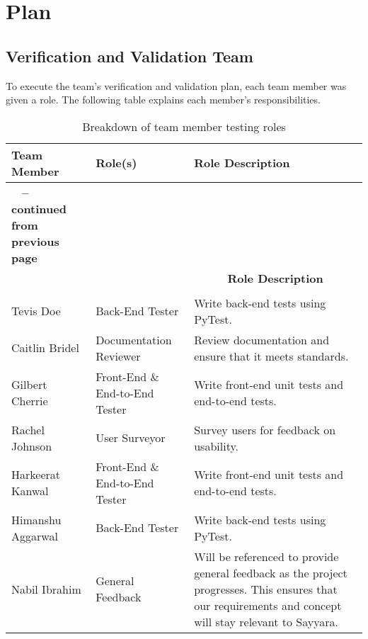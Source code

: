 \documentclass[12pt, titlepage]{article}
\begin{document}
\citet{SRS}

\section{Plan}


\subsection{Verification and Validation Team}

To execute the team's verification and validation plan, each team member was given a role. The following table explains each member's responsibilities.

\renewcommand{\arraystretch}{1.8}%
\begin{longtable}{|>{\centering\arraybackslash}m{.22\linewidth}|>{\centering\arraybackslash}m{.19\linewidth}|m{.59\linewidth}| }
\caption{Breakdown of team member testing roles}
\label{tab:teamRoles}
\\ \hline
\textbf{Team Member} & \textbf{Role(s)} & \textbf{Role Description} \\
\hline
\endfirsthead

\multicolumn{3}{c}
{{\bfseries \tablename\ \thetable{} -- continued from previous page}} \\
\hline \multicolumn{1}{|c|}{\textbf{Team Member}} & \multicolumn{1}{c|}{\textbf{Role(s)}} & \multicolumn{1}{c|}{\textbf{Role Description}} \\ \hline 
\endhead

\hline \multicolumn{3}{|r|}{{Continued on next page}} \\ \hline
\endfoot

\endlastfoot

Tevis Doe & Back-End Tester  &  Write back-end tests using PyTest. \\
\hline
Caitlin Bridel & Documentation Reviewer & Review documentation and ensure that it meets standards. \\ 
\hline
Gilbert Cherrie & Front-End \& End-to-End Tester &  Write front-end unit tests and end-to-end tests.  \\ 
\hline
Rachel Johnson & User Surveyor & Survey users for feedback on usability. \\ 
\hline
Harkeerat Kanwal &  Front-End \& End-to-End Tester & Write front-end unit tests and end-to-end tests.  \\ 
\hline
Himanshu Aggarwal & Back-End Tester & Write back-end tests using PyTest. \\ 
\hline
Nabil Ibrahim & General Feedback & Will be referenced to provide general feedback as the project progresses. This ensures that our requirements and concept will stay relevant to Sayyara.
\hline
\end{longtable}
\end{document}
